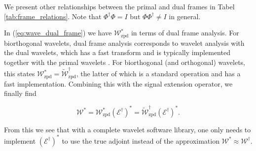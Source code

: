 \documentclass[journal]{IEEEtran}
\newcommand{\dual}{\widetilde}
\begin{document}
   \noindent We present other relationships between the primal and dual frames in Tabel \ref{tab:frame_relations}.  Note that $\Phi^\dagger\Phi=I$ but $\Phi\Phi^\dagger\neq I$ in general.

   In (\ref{eq:wave_dual_frame}) we have $\mathcal{W}_\text{zpd}^\ast$ in terms of dual frame analysis.  For biorthogonal wavelets, dual frame analysis corresponds to wavelet analysis with the dual wavelets, which has a fast transform and is typically implemented together with the primal wavelets \cite{matlab_wt_2015}.  For biorthogonal (and orthogonal) wavelets, this states $\mathcal{W}^\ast_\text{zpd}=\dual{\mathcal{W}}_\text{zpd}^\dagger$, the latter of which is a standard operation and has a fast implementation.  Combining this with the signal extension operator, we finally find

   \begin{equation}
   \label{eq:full_wave_adjoint}
      \mathcal{W}^\ast = \mathcal{W}_\text{zpd}^\ast\left(\mathcal{E}^\dagger\right)^\ast = \dual{\mathcal{W}}_\text{zpd}^\dagger\left(\mathcal{E}^\dagger\right)^\ast.
   \end{equation}
   
   \noindent From this we see that with a complete wavelet software library, one only needs to implement $(\mathcal{E}^\dagger)^\ast$ to use the true adjoint instead of the approximation $\mathcal{W}^\ast\approx\mathcal{W}^\dagger$.


\end{document}
